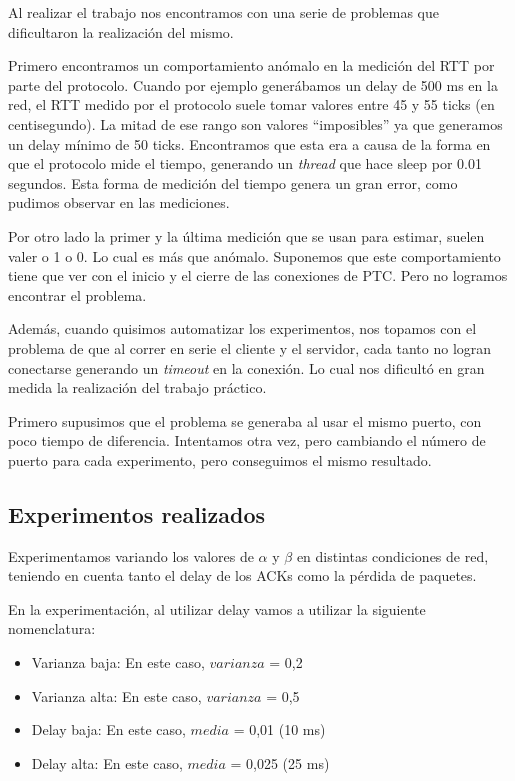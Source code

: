 Al realizar el trabajo nos encontramos con una serie de problemas que dificultaron la realizaci\'on del mismo.

Primero encontramos un comportamiento an\'omalo en la medici\'on del RTT por parte del protocolo. Cuando por ejemplo gener\'abamos un delay de 500 ms en la red, el RTT medido por el protocolo suele tomar valores entre 45 y 55 ticks (en centisegundo). La mitad de ese rango son valores ``imposibles'' ya que generamos un delay m\'inimo de 50 ticks. 
Encontramos que esta era a causa de la forma en que el protocolo mide el tiempo, generando un \emph{thread} que hace sleep por 0.01 segundos. Esta forma de medici\'on del tiempo genera un gran error, como pudimos observar en las mediciones.

Por otro lado la primer y la \'ultima medici\'on que se usan para estimar, suelen valer o 1 o 0. Lo cual es m\'as que an\'omalo. Suponemos que este comportamiento tiene que ver con el inicio y el cierre de las conexiones de PTC. Pero no logramos encontrar el problema.

Adem\'as, cuando quisimos automatizar los experimentos, nos topamos con el problema de que al correr en serie el cliente y el servidor, cada tanto no logran conectarse generando un \emph{timeout} en la conexi\'on. Lo cual nos dificult\'o en gran medida la realizaci\'on del trabajo pr\'actico.

Primero supusimos que el problema se generaba al usar el mismo puerto, con poco tiempo de diferencia. Intentamos otra vez, pero cambiando el n\'umero de puerto para cada experimento, pero conseguimos el mismo resultado.

\subsection{Experimentos realizados}
Experimentamos variando los valores de $\alpha$ y $\beta$ en distintas condiciones de red, teniendo en cuenta tanto el delay de los ACKs como la pérdida de paquetes.

En la experimentación, al utilizar delay vamos a utilizar la siguiente nomenclatura:
\begin{itemize}
 \item Varianza baja: En este caso, $varianza$ = 0,2
 \item Varianza alta: En este caso, $varianza$ = 0,5
 \item Delay baja: En este caso, $media$ = 0,01 (10 ms)
 \item Delay alta: En este caso, $media$ = 0,025 (25 ms)
\end{itemize}
 
